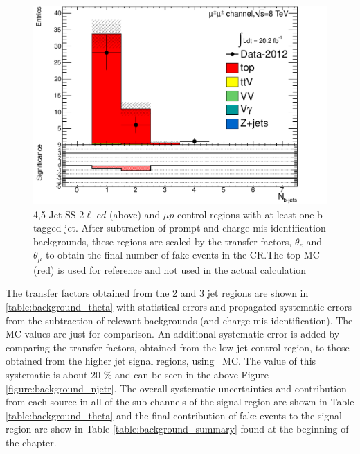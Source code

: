 \begin{figure}[htbp]
\begin{minipage}[h]{0.5\textwidth}
  \end{minipage}\hfill
  \begin{minipage}[h]{0.5\textwidth}
    \centering \includegraphics[width=\textwidth]{figs/fake/TaT-5jets-1b_nb_mm}
  \end{minipage}\hfill

  \caption{4,5 Jet SS 2$\ell$  $ed$ (above) and $\mu p$ control regions with at least one b-tagged jet. After subtraction of prompt and charge mis-identification backgrounds, these regions
    are scaled by the transfer factors, $\theta_e$ and $\theta_{\mu}$ to obtain the final number of fake events in the CR.The top MC (red) is
  used for reference and not used in the actual calculation}
  \label{figure:background_45jets}
 \end{figure}

The transfer factors obtained from the 2 and 3 jet regions are shown in \ref{table:background_theta} with statistical errors and propagated systematic
errors from the subtraction of relevant backgrounds (\ttV and charge mis-identification). The MC values are just for comparison. An additional 
systematic error is added by comparing the transfer factors, obtained from the low jet control region, to those obtained from the 
higher jet signal regions, using \ttbar\ MC. The value of this systematic is about 20 \% and can be seen in the above Figure \ref{figure:background_njetr}.
The overall systematic uncertainties and contribution from each source in all of the sub-channels of the signal region are shown in Table \ref{table:background_theta}
and the final contribution of fake events to the signal region are show in Table \ref{table:background_summary} found at the beginning of the chapter.  

